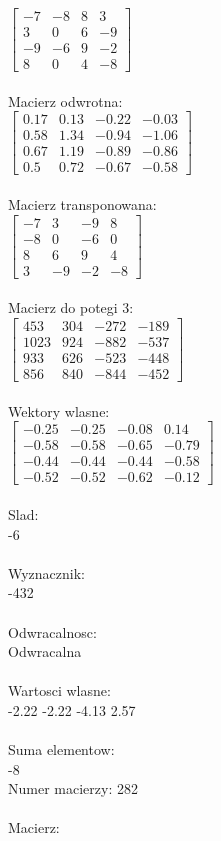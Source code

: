 \documentclass[a4paper,12pt]{article}
\begin{document}
$\begin{bmatrix} -7&-8&8&3\\3&0&6&-9\\-9&-6&9&-2\\8&0&4&-8 \end{bmatrix}$
\\
\\
Macierz odwrotna:\\

$\begin{bmatrix} 0.17&0.13&-0.22&-0.03\\0.58&1.34&-0.94&-1.06\\0.67&1.19&-0.89&-0.86\\0.5&0.72&-0.67&-0.58 \end{bmatrix}$
\\
\\
Macierz transponowana:\\

$\begin{bmatrix} -7&3&-9&8\\-8&0&-6&0\\8&6&9&4\\3&-9&-2&-8 \end{bmatrix}$
\\
\\
Macierz do potegi 3:\\

$\begin{bmatrix} 453&304&-272&-189\\1023&924&-882&-537\\933&626&-523&-448\\856&840&-844&-452 \end{bmatrix}$
\\
\\
Wektory wlasne:\\

$\begin{bmatrix} -0.25&-0.25&-0.08&0.14\\-0.58&-0.58&-0.65&-0.79\\-0.44&-0.44&-0.44&-0.58\\-0.52&-0.52&-0.62&-0.12 \end{bmatrix}$
\\
\\
Slad:\\
-6
\\
\\
Wyznacznik:\\
-432
\\
\\
Odwracalnosc:\\
Odwracalna
\\
\\
Wartosci wlasne:\\
-2.22 -2.22 -4.13 2.57
\\
\\
Suma elementow:\\
-8
\\
\newpage
Numer macierzy:
282
\\
\\
Macierz:\\
\end{document}
